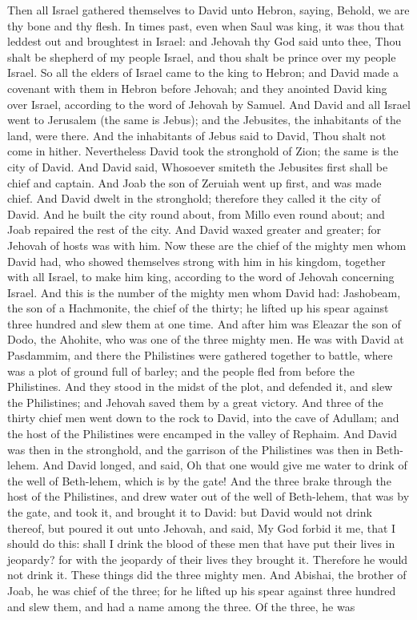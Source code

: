 Then all Israel gathered themselves to David unto Hebron, saying, Behold, we are thy bone and thy flesh. In times past, even when Saul was king, it was thou that leddest out and broughtest in Israel: and Jehovah thy God said unto thee, Thou shalt be shepherd of my people Israel, and thou shalt be prince over my people Israel. So all the elders of Israel came to the king to Hebron; and David made a covenant with them in Hebron before Jehovah; and they anointed David king over Israel, according to the word of Jehovah by Samuel.  And David and all Israel went to Jerusalem (the same is Jebus); and the Jebusites, the inhabitants of the land, were there. And the inhabitants of Jebus said to David, Thou shalt not come in hither. Nevertheless David took the stronghold of Zion; the same is the city of David. And David said, Whosoever smiteth the Jebusites first shall be chief and captain. And Joab the son of Zeruiah went up first, and was made chief. And David dwelt in the stronghold; therefore they called it the city of David. And he built the city round about, from Millo even round about; and Joab repaired the rest of the city. And David waxed greater and greater; for Jehovah of hosts was with him.  Now these are the chief of the mighty men whom David had, who showed themselves strong with him in his kingdom, together with all Israel, to make him king, according to the word of Jehovah concerning Israel. And this is the number of the mighty men whom David had: Jashobeam, the son of a Hachmonite, the chief of the thirty; he lifted up his spear against three hundred and slew them at one time. And after him was Eleazar the son of Dodo, the Ahohite, who was one of the three mighty men. He was with David at Pasdammim, and there the Philistines were gathered together to battle, where was a plot of ground full of barley; and the people fled from before the Philistines. And they stood in the midst of the plot, and defended it, and slew the Philistines; and Jehovah saved them by a great victory.  And three of the thirty chief men went down to the rock to David, into the cave of Adullam; and the host of the Philistines were encamped in the valley of Rephaim. And David was then in the stronghold, and the garrison of the Philistines was then in Beth-lehem. And David longed, and said, Oh that one would give me water to drink of the well of Beth-lehem, which is by the gate! And the three brake through the host of the Philistines, and drew water out of the well of Beth-lehem, that was by the gate, and took it, and brought it to David: but David would not drink thereof, but poured it out unto Jehovah, and said, My God forbid it me, that I should do this: shall I drink the blood of these men that have put their lives in jeopardy? for with the jeopardy of their lives they brought it. Therefore he would not drink it. These things did the three mighty men.  And Abishai, the brother of Joab, he was chief of the three; for he lifted up his spear against three hundred and slew them, and had a name among the three. Of the three, he was 